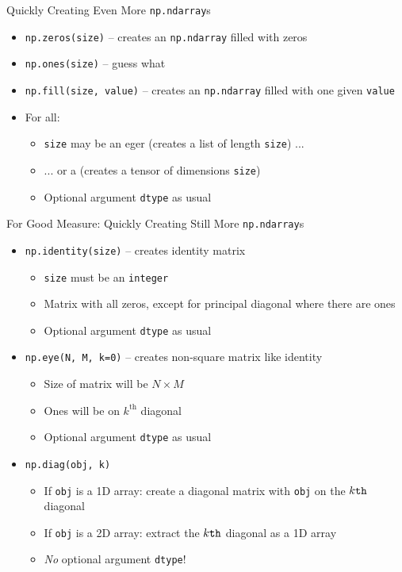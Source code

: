 \begin{frame}[fragile]{Quickly Creating Even More \texttt{np.ndarray}s}
%
\begin{itemize}
\item \texttt{np.zeros(size)} -- creates an \texttt{np.ndarray} filled with zeros
\item \texttt{np.ones(size)} -- guess what
\item \texttt{np.fill(size, value)} --  creates an \texttt{np.ndarray} filled with one given \texttt{value}
\item For all:
	\begin{itemize}
	\item \texttt{size} may be an eger (creates a list of length \texttt{size}) ...
	\item ... or a  (creates a tensor of dimensions \texttt{size})
	\item Optional argument \texttt{dtype} as usual
	\end{itemize}
\end{itemize}
%
\end{frame}


\begin{frame}[fragile]{For Good Measure: Quickly Creating Still More \texttt{np.ndarray}s}
%
\begin{itemize}
\item \texttt{np.identity(size)} -- creates identity matrix
	\begin{itemize}
	\item \texttt{size} must be an \texttt{integer}
	\item Matrix with all zeros, except for principal diagonal where there are ones
	\item Optional argument \texttt{dtype} as usual
	\end{itemize}
\item \texttt{np.eye(N, M, k=0)} -- creates non-square matrix like identity
	\begin{itemize}
	\item Size of matrix will be $N \times M$
	\item Ones will be on $k^{\text{th}}$ diagonal
	\item Optional argument \texttt{dtype} as usual
	\end{itemize}
\item \texttt{np.diag(obj, k)}
	\begin{itemize}
	\item If \texttt{obj} is a 1D array: create a diagonal matrix with \texttt{obj} on the $k\texttt{\text{th}}$ diagonal
	\item If \texttt{obj} is a 2D array: extract the $k\texttt{\text{th}}$ diagonal as a 1D array
	\item \emph{No} optional argument \texttt{dtype}!
	\end{itemize}
\end{itemize}
%
\end{frame}

